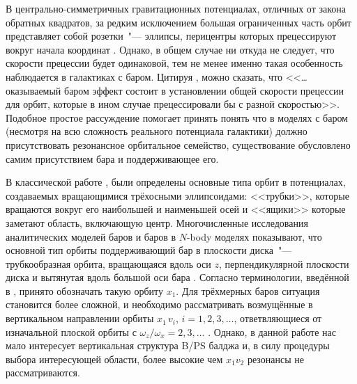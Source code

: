 \documentclass[tikz]{trlnotes}
\begin{document}
\newlength{\imageheight}
\imageheight=5.5cm
В центрально-симметричных гравитационных потенциалах, отличных от закона обратных квадратов,
за редким исключением большая ограниченных часть орбит представляет собой розетки~"--- эллипсы, перицентры которых
прецессируют вокруг начала координат \citep{book:14857}. Однако, в общем случае ни откуда не следует, что скорости прецессии
будет одинаковой, тем не менее именно такая особенность наблюдается в галактиках с баром.
Цитируя \cite{sellwood2014a}, можно сказать, что <<\ldots оказываемый баром эффект состоит в установлении общей скорости
прецессии для орбит, которые в ином случае прецессировали бы с разной скоростью>>.
Подобное простое рассуждение помогает принять понять что в моделях с баром (несмотря на всю сложность реального потенциала галактики)
должно присутствовать резонансное орбитальное семейство, существование обусловлено самим присутствием бара и поддерживающее его.

В классической работе \citet{dezeeuw1985}, были определены основные типа орбит в потенциалах, создаваемых
вращающимися трёхосными эллипсоидами: <<трубки>>, которые
вращаются вокруг его наибольшей и наименьшей осей и <<ящики>> которые
заметают область, включающую центр.  Многочисленные исследования аналитических моделей баров и баров в $N$-body
моделях показывают, что основной тип орбиты поддерживающий бар в плоскости диска~"--- трубкообразная орбита,
вращающаяся вдоль оси $z$, перпендикулярной плоскости диска и вытянутая вдоль большой оси бара
\citep{athanassoula2003}. Согласно терминологии, введённой в \citet{contopoulos1980a}, принято обозначать такую
орбиту $x_1$. Для трёхмерных баров ситуация становится более сложной, и необходимо рассматривать возмущённые в
вертикальном направлении орбиты $x_1\,v_i$, $i=1,2,3, \dotsc$, ответвляющиеся от изначальной плоской орбиты с
$ω_z/ω_x = 2,3, \dotsc$ \citep{skokos2002a,pfenniger1991}. Однако, в данной работе нас мало интересует
вертикальная структура B/PS балджа и, в силу процедуры выбора интересующей области, более высокие чем $x_1v_2$
резонансы не рассматриваются.
\end{document}
